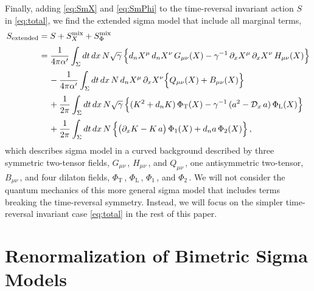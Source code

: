 \documentclass[11pt]{article}
\newcommand{\CD}{\mathcal{D}}
\newcommand{\p}{\partial}
\begin{document}
Finally, adding \eqref{eq:SmX} and \eqref{eq:SmPhi} to the time-reversal invariant action $S$ in \eqref{eq:total}, we find the extended sigma model that include all marginal terms,
%
\begin{align}
\begin{split}
	S_\text{extended} & = S + S^\text{mix}_X + S^\text{mix}_\Phi \\[2pt]
		& = \frac{1}{4\pi\alpha'} \int_\Sigma dt \, dx \, N \sqrt{\gamma} \, \Big\{ d_n X^\mu \, d_n X^\nu \, G_{\mu\nu} (X) - \gamma^{-1} \, \p_x X^\mu \, \p_x X^\nu \, H_{\mu\nu} (X) \Bigr\} \\[2pt]
		& \quad\, - \frac{1}{4\pi\alpha'} \int_{\Sigma} dt \, dx \, N \, d_n X^\mu \, \p_x X^\nu \Bigl\{ Q_{\mu\nu} (X) + B_{\mu\nu} (X) \Bigr\} \\[2pt]
	 	& \quad\, + \frac{1}{2\pi} \int_\Sigma dt \, dx \, N \sqrt{\gamma} \, \Bigl\{ (K^2 + d_n K) \, \Phi_\text{T} (X) - \gamma^{-1} \, (a^2 - \CD_{x} \, a) \, \Phi_\text{L} (X) \Bigr\} \\[2pt]
		& \quad\, + \frac{1}{2\pi} \int_\Sigma dt \, dx \, N \, \Bigl\{ \bigl( \p_x K  - K \, a \bigr) \, \Phi_1 (X) + d_n a \, \Phi_2 (X) \Bigr\}\,,
\end{split}
\end{align}
%
which describes sigma model in a curved background described by three symmetric two-tensor fields, $G_{\mu\nu}$\,, $H_{\mu\nu}$\,, and $Q_{\mu\nu}$\,, one antisymmetric two-tensor, $B_{\mu\nu}$\,, and four dilaton fields, $\Phi_\text{T}$\,, $\Phi_\text{L}$\,, $\Phi_1$\,, and $\Phi_2$\,. 
We will not consider the quantum mechanics of this more general sigma model that includes terms breaking the time-reversal symmetry. Instead, we will focus on the simpler time-reversal invariant case \eqref{eq:total} in the rest of this paper. 


\section{Renormalization of Bimetric Sigma Models} \label{sec:rbsm}
\end{document}
